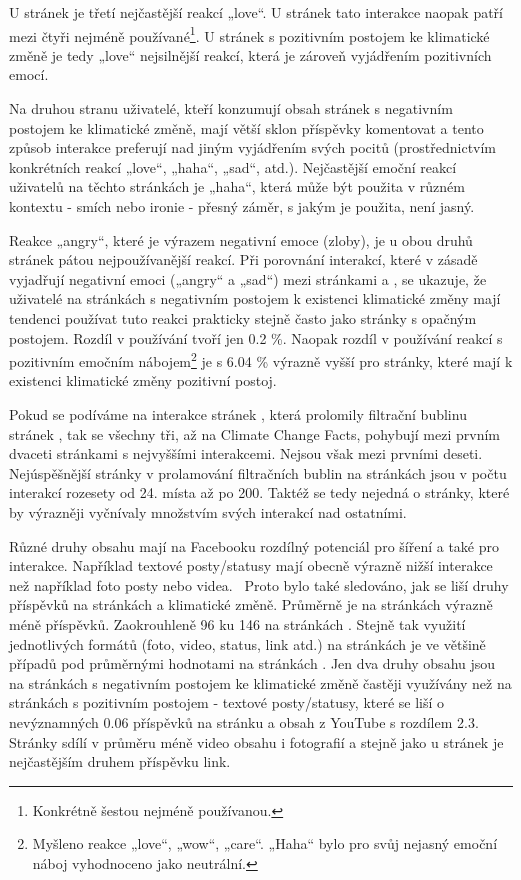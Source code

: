     U stránek  je třetí nejčastější reakcí „love“. U stránek  tato interakce naopak patří mezi čtyři nejméně používané\footnote{Konkrétně šestou nejméně používanou.}. U stránek s pozitivním postojem ke klimatické změně je tedy „love“ nejsilnější reakcí, která je zároveň vyjádřením pozitivních emocí. 
    
    Na druhou stranu uživatelé, kteří konzumují obsah stránek s negativním postojem ke klimatické změně, mají větší sklon příspěvky komentovat a tento způsob interakce preferují nad jiným vyjádřením svých pocitů (prostřednictvím konkrétních reakcí „love“, „haha“, „sad“, atd.). Nejčastější emoční reakcí uživatelů na těchto stránkách je „haha“, která může být použita v různém kontextu - smích nebo ironie - přesný záměr, s jakým je použita, není jasný. 
    
    Reakce „angry“, které je výrazem negativní emoce (zloby), je u obou druhů stránek pátou nejpoužívanější reakcí. Při porovnání interakcí, které v zásadě vyjadřují negativní emoci („angry“ a „sad“) mezi stránkami  a , se ukazuje, že uživatelé na stránkách s negativním postojem k existenci klimatické změny mají tendenci používat tuto reakci prakticky stejně často jako stránky s opačným postojem. Rozdíl v používání tvoří jen 0.2 \%. Naopak rozdíl v používání reakcí s pozitivním emočním nábojem\footnote{Myšleno reakce „love“, „wow“, „care“. „Haha“ bylo pro svůj nejasný emoční náboj vyhodnoceno jako neutrální.} je s 6.04 \% výrazně vyšší pro stránky, které mají k existenci klimatické změny pozitivní postoj.
    
    Pokud se podíváme na interakce stránek , která prolomily filtrační bublinu stránek , tak se všechny tři, až na Climate Change Facts, pohybují mezi prvním dvaceti stránkami s nejvyššími interakcemi. Nejsou však mezi prvními deseti. Nejúspěšnější stránky  v prolamování filtračních bublin na stránkách  jsou v počtu interakcí rozesety od 24. místa až po 200. Taktéž se tedy nejedná o stránky, které by výrazněji vyčnívaly množstvím svých interakcí nad ostatními. 

    Různé druhy obsahu mají na Facebooku rozdílný potenciál pro šíření a také pro interakce. Například textové posty/statusy mají obecně výrazně nižší interakce než například foto posty nebo videa.~\citep{newberry_mclachlan_2021} Proto bylo také sledováno, jak se liší druhy příspěvků na stránkách  a  klimatické změně. Průměrně je na stránkách  výrazně méně příspěvků. Zaokrouhleně 96 ku 146 na stránkách . Stejně tak využití jednotlivých formátů (foto, video, status, link atd.) na stránkách  je ve většině případů pod průměrnými hodnotami na stránkách . Jen dva druhy obsahu jsou na stránkách s negativním postojem ke klimatické změně častěji využívány než na stránkách s pozitivním postojem - textové posty/statusy, které se liší o nevýznam\-ných 0.06 příspěvků na stránku a obsah z YouTube s rozdílem 2.3. Stránky  sdílí v průměru méně video obsahu i fotografií a stejně jako u stránek  je nejčastějším druhem příspěvku link.  
    
